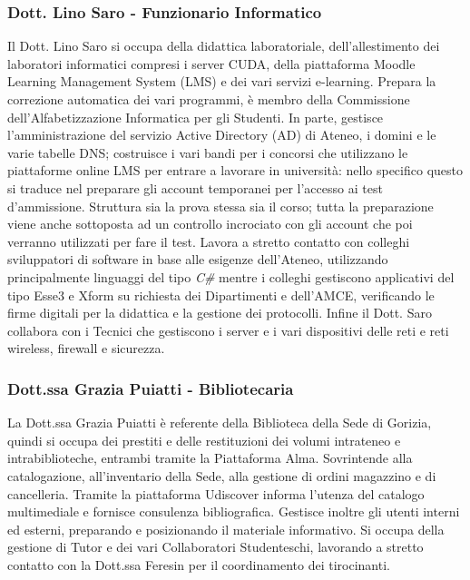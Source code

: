         \subsubsection{Dott. Lino Saro - Funzionario Informatico}
            Il Dott. Lino Saro si occupa della didattica laboratoriale, dell'allestimento dei laboratori informatici compresi i server CUDA, della piattaforma Moodle Learning Management System (LMS) e dei vari servizi e-learning. Prepara la correzione automatica dei vari programmi, è membro della Commissione dell'Alfabetizzazione Informatica per gli Studenti. \newline
            In parte, gestisce l'amministrazione del servizio Active Directory (AD) di Ateneo, i domini e le varie tabelle DNS; costruisce i vari bandi per i concorsi che utilizzano le piattaforme online LMS per entrare a lavorare in università: nello specifico questo si traduce nel preparare gli account temporanei per l'accesso ai test d'ammissione. Struttura sia la prova stessa sia il corso; tutta la preparazione viene anche sottoposta ad un controllo incrociato con gli account che poi verranno utilizzati per fare il test. \newline
            Lavora a stretto contatto con colleghi sviluppatori di software in base alle esigenze dell'Ateneo, utilizzando principalmente linguaggi del tipo \textsl{C\#} mentre i colleghi gestiscono applicativi del tipo Esse3 e Xform su richiesta dei Dipartimenti e dell'AMCE, verificando le firme digitali per la didattica e la gestione dei protocolli. Infine il Dott. Saro collabora con i Tecnici che gestiscono i server e i vari dispositivi delle reti e reti wireless, firewall e sicurezza. 
        \subsubsection{Dott.ssa Grazia Puiatti - Bibliotecaria}
            La Dott.ssa Grazia Puiatti è referente della Biblioteca della Sede di Gorizia, quindi si occupa dei prestiti e delle restituzioni dei volumi intrateneo e intrabiblioteche, entrambi tramite la Piattaforma Alma. Sovrintende alla catalogazione, all'inventario della Sede, alla gestione di ordini magazzino e di cancelleria. Tramite la piattaforma Udiscover informa l'utenza del catalogo multimediale e fornisce consulenza bibliografica. \newline
            Gestisce inoltre gli utenti interni ed esterni, preparando e posizionando il materiale informativo. Si occupa della gestione di Tutor e dei vari Collaboratori Studenteschi, lavorando a stretto contatto con la Dott.ssa Feresin per il coordinamento dei tirocinanti.
